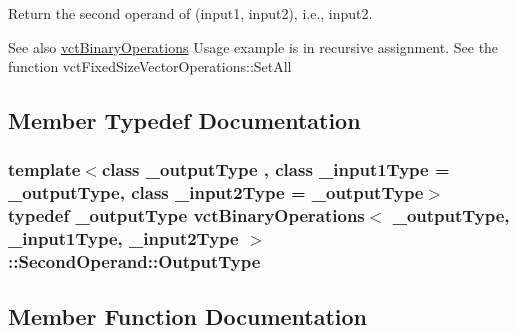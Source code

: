 Return the second operand of (input1, input2), i.\+e., input2. 

\begin{DoxySeeAlso}{See also}
\hyperlink{classvct_binary_operations}{vct\+Binary\+Operations} Usage example is in recursive assignment. See the function vct\+Fixed\+Size\+Vector\+Operations\+::\+Set\+All 
\end{DoxySeeAlso}


\subsection{Member Typedef Documentation}
\hypertarget{classvct_binary_operations_1_1_second_operand_acc7e6d4248e776359bcefe27a2ea9f53}{}
\subsubsection[{Output\+Type}]{\setlength{\rightskip}{0pt plus 5cm}template$<$class \+\_\+output\+Type , class \+\_\+input1\+Type  = \+\_\+output\+Type, class \+\_\+input2\+Type  = \+\_\+output\+Type$>$ typedef \+\_\+output\+Type {\bf vct\+Binary\+Operations}$<$ \+\_\+output\+Type, \+\_\+input1\+Type, \+\_\+input2\+Type $>$\+::{\bf Second\+Operand\+::\+Output\+Type}}\label{classvct_binary_operations_1_1_second_operand_acc7e6d4248e776359bcefe27a2ea9f53}


\subsection{Member Function Documentation}
\hypertarget{classvct_binary_operations_1_1_second_operand_a0de9cd948a8e946006c19fea34be7a90}{}
